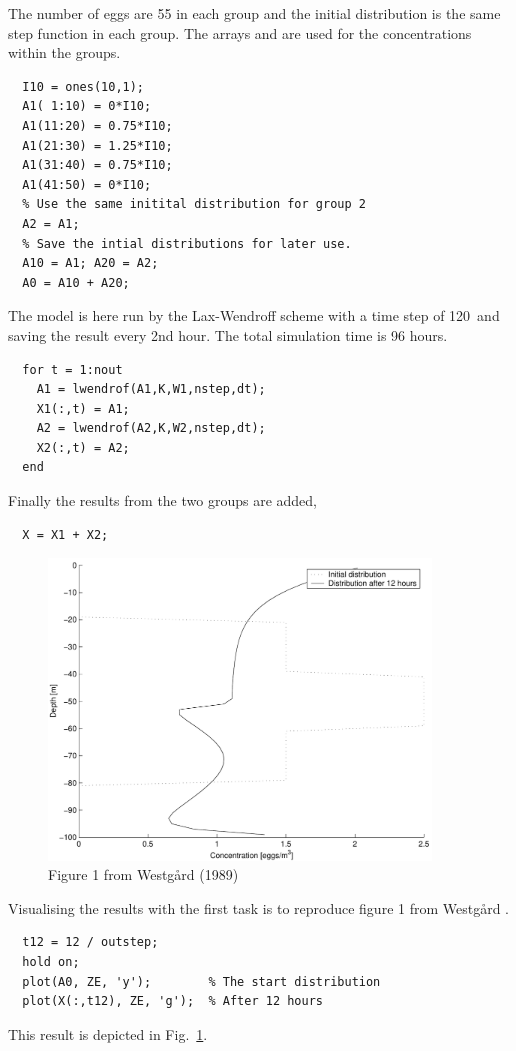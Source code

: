 The number of eggs are 55 in each group and the initial distribution
is the same step function in each group. The arrays  and
 are used for the concentrations within the groups.
\begin{verbatim}
  I10 = ones(10,1);
  A1( 1:10) = 0*I10;
  A1(11:20) = 0.75*I10;
  A1(21:30) = 1.25*I10;
  A1(31:40) = 0.75*I10;
  A1(41:50) = 0*I10;
  % Use the same initital distribution for group 2
  A2 = A1;
  % Save the intial distributions for later use.
  A10 = A1; A20 = A2;
  A0 = A10 + A20;
\end{verbatim}

The model is here run by the Lax-Wendroff scheme with a time step of 120\s\
and saving the result every 2nd hour. The total simulation time is 96
hours. 
\begin{verbatim}
  for t = 1:nout
    A1 = lwendrof(A1,K,W1,nstep,dt);
    X1(:,t) = A1;
    A2 = lwendrof(A2,K,W2,nstep,dt);
    X2(:,t) = A2;
  end
\end{verbatim}
Finally the results from the two groups are added,
\begin{verbatim}
  X = X1 + X2;
\end{verbatim}

\begin{figure}
\begin{center}
\includegraphics[height=8cm]{ex5a}
\end{center}
\caption{Figure 1 from Westg{\aa}rd (1989)}\label{fig:ex5a}
\end{figure}


Visualising the results with  the first task is to
reproduce figure 1 from Westg{\aa}rd .
\begin{verbatim}
  t12 = 12 / outstep;
  hold on;
  plot(A0, ZE, 'y');        % The start distribution   
  plot(X(:,t12), ZE, 'g');  % After 12 hours
\end{verbatim}
This result is depicted in Fig.~\ref{fig:ex5a}.


